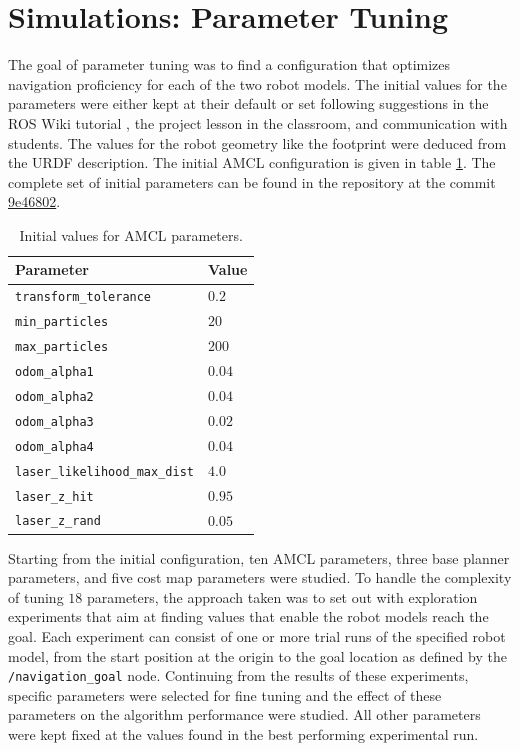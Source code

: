 \documentclass[10pt,journal,compsoc]{IEEEtran}
\begin{document}
\section{Simulations: Parameter Tuning}
\label{sec:simulations_parameter_tuning}
The goal of parameter tuning was to find a configuration that optimizes navigation proficiency for each of the two robot models. The initial values for the parameters were either kept at their default or set following suggestions in the ROS Wiki tutorial \cite{ros_wiki_nav_stack}, the project lesson in the classroom, and communication with students. The values for the robot geometry like the footprint were deduced from the URDF description. The initial AMCL configuration is given in table \ref{tab:initial_values_amcl}. The complete set of initial parameters can be found in the repository at the commit \href{https://github.com/S2H-Mobile/RoboND-Localization-Project/tree/9e4680226e74e2f6d12710e168e3d0a65ce26e66}{9e46802}.
\begin{table}[th]
\caption{Initial values for AMCL parameters.}
\label{tab:initial_values_amcl}
\begin{center}
\renewcommand{\arraystretch}{1.3}
\begin{tabular}{|l|l|}
\hline
Parameter & Value \\
\hline
\texttt{transform\_tolerance} & $0.2$ \\
\hline
\texttt{min\_particles} & $20$  \\
\texttt{max\_particles} & $200$ \\
\hline
\texttt{odom\_alpha1} & $0.04$ \\
\texttt{odom\_alpha2} & $0.04$ \\
\texttt{odom\_alpha3} & $0.02$ \\
\texttt{odom\_alpha4} & $0.04$ \\
\hline
\texttt{laser\_likelihood\_max\_dist} & $4.0$ \\
\hline
\texttt{laser\_z\_hit}  & $0.95$ \\
\texttt{laser\_z\_rand} & $0.05$ \\
\hline
\end{tabular}
\end{center}
\end{table}

Starting from the initial configuration, ten AMCL parameters, three base planner parameters, and five cost map parameters were studied. To handle the complexity of tuning $18$ parameters, the approach taken was to set out with exploration experiments that aim at finding values that enable the robot models reach the goal. Each experiment can consist of one or more trial runs of the specified robot model, from the start position at the origin to the goal location as defined by the \texttt{/navigation\_goal} node. Continuing from the results of these experiments, specific parameters were selected for fine tuning and the effect of these parameters on the algorithm performance were studied. All other parameters were kept fixed at the values found in the best performing experimental run.
\end{document}
